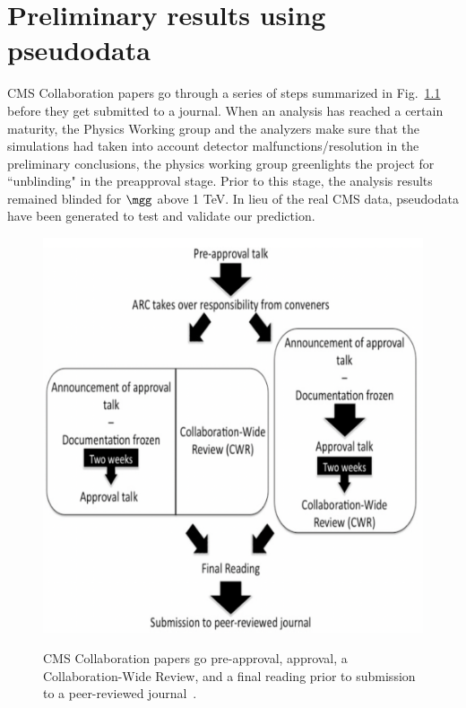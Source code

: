 \chapter{Preliminary results using pseudodata}
\RaggedRight \parindent=25pt
\label{ch:appendix_pseudodata}
\begin{spacing}{2}
CMS Collaboration papers go through a series of steps summarized in Fig.~\ref{Fig:CMSPubJourney} before they get submitted to a journal. 
When an analysis has reached a certain maturity, the Physics Working group and the analyzers make sure that the simulations had taken into account detector malfunctions/resolution in the preliminary conclusions, the physics working group greenlights the project for ``unblinding" in the preapproval stage. Prior to this stage, the analysis results remained blinded for $\mgg$ above 1 TeV. In lieu of the real CMS data, pseudodata have been generated to test and validate our prediction. 

\begin{figure}[htbp!]\centering
\caption{CMS Collaboration papers go pre-approval, approval, a Collaboration-Wide Review, and a final reading prior to submission to a peer-reviewed journal~\cite{CMSPublishing}.}
\includegraphics[scale=0.7]{fig/CMSPublication.png}
\label{Fig:CMSPubJourney}
\end{figure}



\end{spacing}
